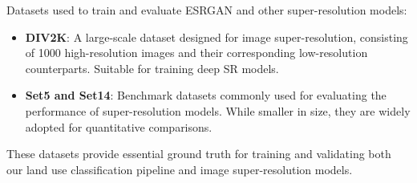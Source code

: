 Datasets used to train and evaluate ESRGAN and other super-resolution models:

\begin{itemize}
  \item \textbf{DIV2K}: A large-scale dataset designed for image super-resolution, consisting of 1000 high-resolution images and their corresponding low-resolution counterparts. Suitable for training deep SR models.
  \item \textbf{Set5 and Set14}: Benchmark datasets commonly used for evaluating the performance of super-resolution models. While smaller in size, they are widely adopted for quantitative comparisons.
\end{itemize}

These datasets provide essential ground truth for training and validating both our land use classification pipeline and image super-resolution models.

